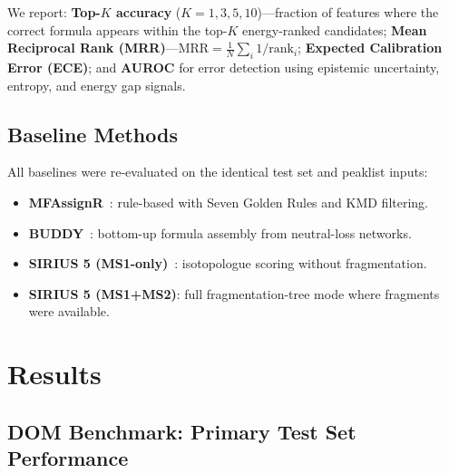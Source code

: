 \documentclass[journal=jcisd8]{achemso}
\begin{document}
We report:
\textbf{Top-$K$ accuracy} ($K=1,3,5,10$)---fraction of features where the correct formula
appears within the top-$K$ energy-ranked candidates;
\textbf{Mean Reciprocal Rank (MRR)}---$\text{MRR} = \frac{1}{N}\sum_i 1/\text{rank}_i$;
\textbf{Expected Calibration Error (ECE)}; and
\textbf{AUROC} for error detection using epistemic uncertainty, entropy, and energy gap signals.

\subsection{Baseline Methods}

All baselines were re-evaluated on the identical test set and peaklist inputs:
\begin{itemize}[nosep]
  \item \textbf{MFAssignR}~\cite{Tolić2017}: rule-based with Seven Golden Rules and KMD filtering.
  \item \textbf{BUDDY}~\cite{Guo2023}: bottom-up formula assembly from neutral-loss networks.
  \item \textbf{SIRIUS 5 (MS1-only)}~\cite{Duehrkop2019}: isotopologue scoring without fragmentation.
  \item \textbf{SIRIUS 5 (MS1+MS2)}: full fragmentation-tree mode where fragments were available.
\end{itemize}

\section{Results}
\label{sec:results}

\subsection{DOM Benchmark: Primary Test Set Performance}
\label{sec:dom_results}
\end{document}
